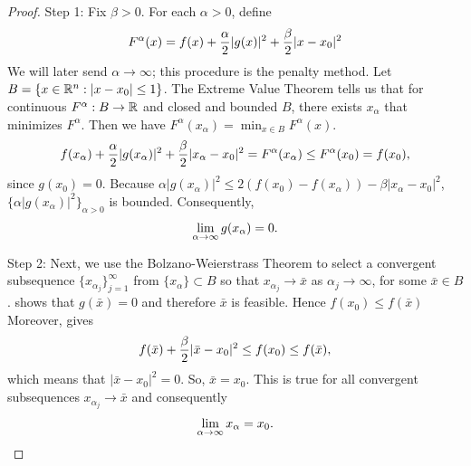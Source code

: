 \begin{proof}
Step 1: Fix $\beta >0$.
For each $\alpha>0$, define
\begin{align}
F^{\alpha}(x) = f(x) + \frac{\alpha}{2} |g(x)|^2 + \frac{\beta}{2} |x-x_0|^2
\labeq{proof_FJcfvf_eq_1}
\end{align}
We will later send $\alpha \to \infty$; this procedure is the penalty method.
Let $B=\{ x \in \mathbb{R}^n : |x-x_0| \le 1 \}$. 
The Extreme Value Theorem tells us that for continuous $F^\alpha: B\to\mathbb{R}$ and closed and bounded $B$, there exists $x_\alpha$ that minimizes $F^\alpha$.
Then we have $F^\alpha(x_\alpha) = \min _{x \in B} F^\alpha(x)$.
\begin{align}
f(x_\alpha) + \frac{\alpha}{2} |g(x_\alpha)|^2 + \frac{\beta}{2} |x_\alpha-x_0|^2 = F^{\alpha}(x_\alpha) \le F^{\alpha}(x_0) = f(x_0),
\labeq{proof_FJcfvf_eq_2}
\end{align}
since $g(x_0) = 0$.
Because $\alpha |g(x_\alpha)|^2 \le 2 (f(x_0) - f(x_\alpha)) - \beta |x_\alpha-x_0|^2$, $\{ \alpha |g(x_\alpha)|^2 \} _{\alpha > 0}$ is bounded.
Consequently,
\begin{align}
\lim _{\alpha \to \infty} g(x_\alpha) = 0.
\labeq{proof_FJcfvf_eq_3}
\end{align}

Step 2: Next, we use the Bolzano-Weierstrass Theorem to select a convergent subsequence $\{ x_{\alpha_j} \}_{j=1}^{\infty}$ from $\{ x_{\alpha} \} \subset B$ so that $x_{\alpha_j} \to \bar{x}$ as $\alpha_j \to \infty$, for some $\bar{x} \in B$.
 shows that $g(\bar{x})=0$ and therefore $\bar{x}$ is feasible.
Hence $f(x_0) \le f(\bar{x})$
Moreover,  gives 
\begin{align}
f(\bar{x}) + \frac{\beta}{2} |\bar{x}-x_0|^2 \le f(x_0) \le f(\bar{x}),
\labeq{proof_FJcfvf_eq_4}
\end{align}
which means that $|\bar{x}-x_0|^2 = 0$.
So, $\bar{x} = x_0$.
This is true for all convergent subsequences $x_{\alpha_j} \to \bar{x}$ and consequently 
\begin{align}
\lim_{\alpha \to \infty} x_{\alpha} = x_0.
\labeq{proof_FJcfvf_eq_5}
\end{align}


\end{proof}
